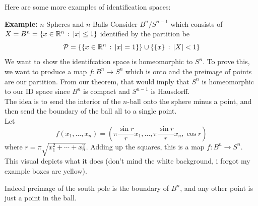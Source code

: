 
Here are some more examples of identification spaces:\\


\begin{example}{\textbf{Example:} $n$-Spheres and $n$-Balls}
    Consider $B^{n} / S^{n - 1}$ which consists of $X = B^{n} = \{x \in \mathbb{R}^n \, :\, \left\lvert {x} \right\rvert \leq 1\}$ identified by the partition be
    \[ \mathcal{P} = \{\{x \in \mathbb{R}^n \, :\, \left\lvert {x} \right\rvert = 1\}\} \cup \{\{x\} \, :\, \left\lvert {X} \right\rvert < 1\}\]
    We want to show the identifcation space is homeomorphic to $S^n$. To prove this, we want to produce a map $f : B^n \to S^{n}$ which is onto and the preimage of points are our partition. From our theorem, that would imply that $S^n$ is homeomorphic to our ID space since $B^{n}$ is compact and $S^{n - 1}$ is Hausdorff.\\

    The idea is to send the interior of the $n$-ball onto the sphere minus a point, and then send the boundary of the ball all to a single point.\\

    Let
    \[ f(x_1, \ldots, x_n) = \left(\pi \frac{\sin r}{r}x_1, \ldots, \pi \frac{\sin r}{r} x_n, \cos r\right) \]
    where $r = \pi \sqrt{x_1^2 + \cdots + x_n^2}$. Adding up the squares, this is a map $f : B^{n} \to S^{n}$. This visual depicts what it does (don't mind the white background, i forgot my example boxes are yellow).\\


    Indeed preimage of the south pole is the boundary of $B^{n}$, and any other point is just a point in the ball.\\

\end{example}

